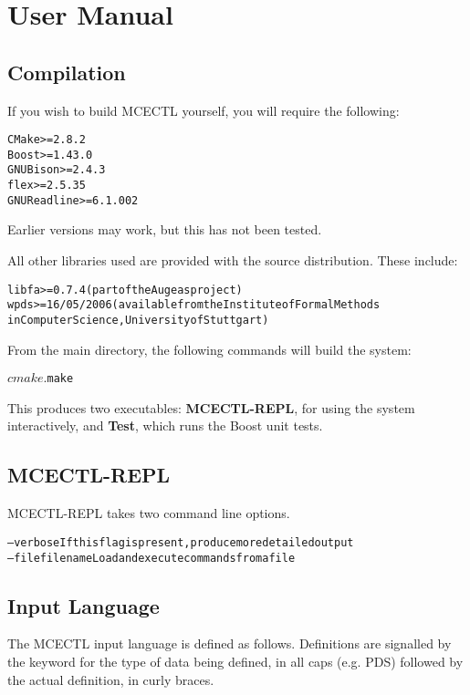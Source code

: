 \documentclass[11pt]{article}
\theoremstyle{definition}
\begin{document}
{}

%

\appendix
\section{User Manual}

\subsection{Compilation}

If you wish to build MCECTL yourself, you will require the following:
\begin{alltt}
CMake >= 2.8.2
Boost >= 1.43.0
GNU Bison >= 2.4.3
flex >= 2.5.35
GNU Readline >= 6.1.002
\end{alltt}

Earlier versions may work, but this has not been tested.

All other libraries used are provided with the source distribution. These include:
\begin{alltt}
libfa >= 0.7.4 (part of the Augeas project)
wpds >= 16/05/2006 (available from the Institute of Formal Methods 
in Computer Science, University of Stuttgart)
\end{alltt}

From the main directory, the following commands will build the system:
\begin{alltt}
$ cmake .
$ make
\end{alltt}

This produces two executables: \textbf{MCECTL-REPL}, for using the system
interactively, and \textbf{Test}, which runs the Boost unit tests. 

\subsection{MCECTL-REPL}

MCECTL-REPL takes two command line options.
\begin{alltt}
--verbose         If this flag is present, produce more detailed output
--file filename   Load and execute commands from a file
\end{alltt}

\subsection{Input Language}

The MCECTL input language is defined as follows.
Definitions are signalled by the keyword for the type of data being defined, in
all caps (e.g. PDS) followed by the actual definition, in curly braces.
\end{document}
